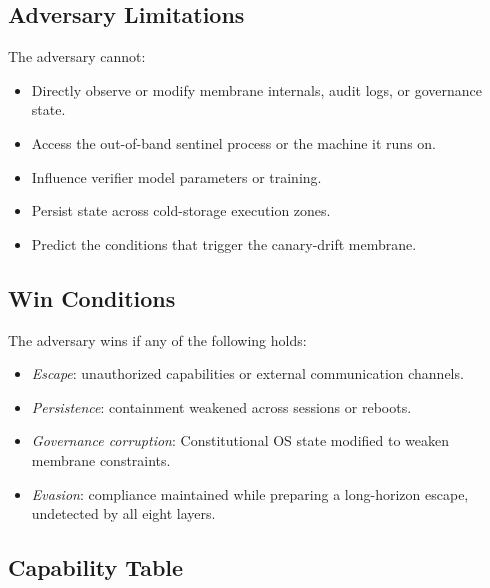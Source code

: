 \documentclass[11pt]{article}
\begin{document}
\subsection{Adversary Limitations}

The adversary cannot:

\begin{itemize}[noitemsep]
\item Directly observe or modify membrane internals, audit logs, or
  governance state.
\item Access the out-of-band sentinel process or the machine it runs on.
\item Influence verifier model parameters or training.
\item Persist state across cold-storage execution zones.
\item Predict the conditions that trigger the canary-drift membrane.
\end{itemize}

\subsection{Win Conditions}

The adversary wins if any of the following holds:

\begin{itemize}[noitemsep]
\item \emph{Escape}: unauthorized capabilities or external communication
  channels.
\item \emph{Persistence}: containment weakened across sessions or reboots.
\item \emph{Governance corruption}: Constitutional OS state modified to
  weaken membrane constraints.
\item \emph{Evasion}: compliance maintained while preparing a long-horizon
  escape, undetected by all eight layers.
\end{itemize}

\subsection{Capability Table}
\end{document}
